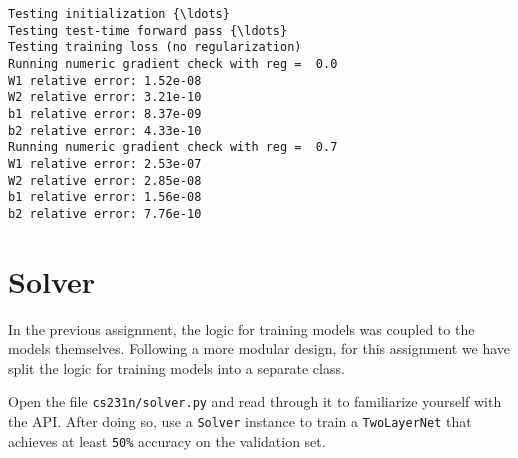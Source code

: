 \documentclass[11pt]{article}
\begin{document}
    \begin{Verbatim}[commandchars=\\\{\}]
Testing initialization {\ldots}
Testing test-time forward pass {\ldots}
Testing training loss (no regularization)
Running numeric gradient check with reg =  0.0
W1 relative error: 1.52e-08
W2 relative error: 3.21e-10
b1 relative error: 8.37e-09
b2 relative error: 4.33e-10
Running numeric gradient check with reg =  0.7
W1 relative error: 2.53e-07
W2 relative error: 2.85e-08
b1 relative error: 1.56e-08
b2 relative error: 7.76e-10
    \end{Verbatim}

    \hypertarget{solver}{%
\section{Solver}\label{solver}}

In the previous assignment, the logic for training models was coupled to
the models themselves. Following a more modular design, for this
assignment we have split the logic for training models into a separate
class.

Open the file \texttt{cs231n/solver.py} and read through it to
familiarize yourself with the API. After doing so, use a \texttt{Solver}
instance to train a \texttt{TwoLayerNet} that achieves at least
\texttt{50\%} accuracy on the validation set.
\end{document}
